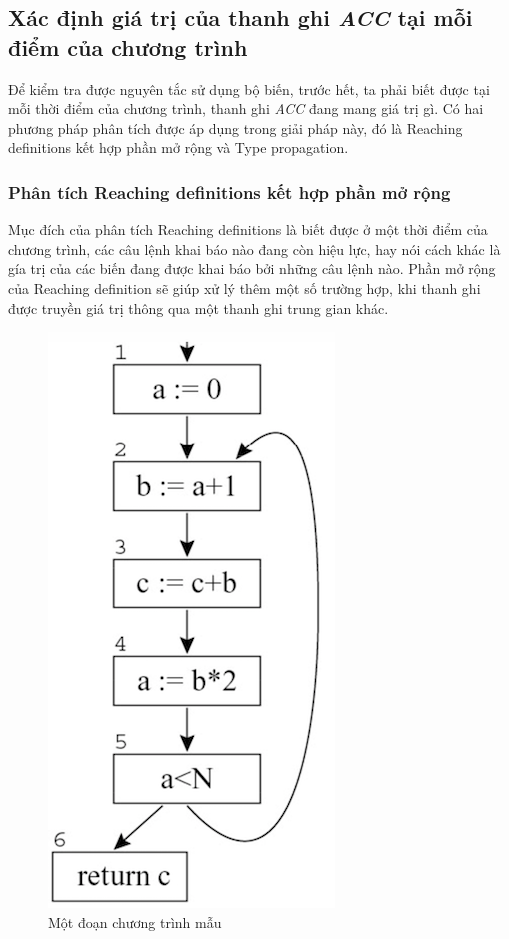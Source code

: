 \subsection{Xác định giá trị của thanh ghi \textit{ACC} tại mỗi điểm của chương trình}
Để kiểm tra được nguyên tắc sử dụng bộ biến, trước hết, ta phải biết được tại mỗi thời điểm của chương trình, thanh ghi \textit{ACC} đang mang giá trị gì. Có hai phương pháp phân tích được áp dụng trong giải pháp này, đó là Reaching definitions kết hợp phần mở rộng và Type propagation.
\subsubsection{Phân tích Reaching definitions kết hợp phần mở rộng}
Mục đích của phân tích Reaching definitions là biết được ở một thời điểm của chương trình, các câu lệnh khai báo nào đang còn hiệu lực, hay nói cách khác là gía trị của các biến đang được khai báo bởi những câu lệnh nào. Phần mở rộng của Reaching definition sẽ giúp xử lý thêm một số trường hợp, khi thanh ghi được truyền giá trị thông qua một thanh ghi trung gian khác.
\begin{figure}
	\centering
	\includegraphics[scale=0.75]{image/reachingDefExam}
	\caption{Một đoạn chương trình mẫu}
	\label{fig:reachingdefexam}
\end{figure}
